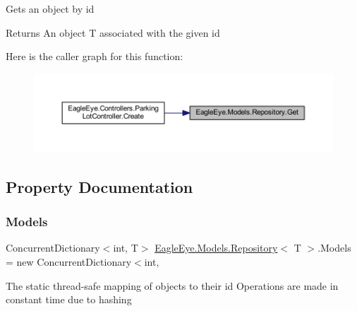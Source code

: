 Gets an object by id 

\begin{DoxyReturn}{Returns}
An object T associated with the given id 
\end{DoxyReturn}
Here is the caller graph for this function\+:
\nopagebreak
\begin{figure}[H]
\begin{center}
\leavevmode
\includegraphics[width=350pt]{class_eagle_eye_1_1_models_1_1_repository_ac44cb18d8cbb605d3f7e14eb09c8c0bf_icgraph}
\end{center}
\end{figure}


\subsection{Property Documentation}
\mbox{\label{class_eagle_eye_1_1_models_1_1_repository_a26d864f26d5b20030d5c7c3e9400954a}} 
\subsubsection{\texorpdfstring{Models}{Models}}
{\footnotesize\ttfamily Concurrent\+Dictionary$<$int, T$>$ \mbox{\hyperlink{class_eagle_eye_1_1_models_1_1_repository}{Eagle\+Eye.\+Models.\+Repository}}$<$ T $>$.Models = new Concurrent\+Dictionary$<$int\hspace{0.3cm}{\ttfamily [static]}, {\ttfamily [get]}}



The static thread-\/safe mapping of objects to their id Operations are made in constant time due to hashing 

\mbox{\label{class_eagle_eye_1_1_models_1_1_repository_a799dfc419bb17912528a53eff82f50ff}} 
